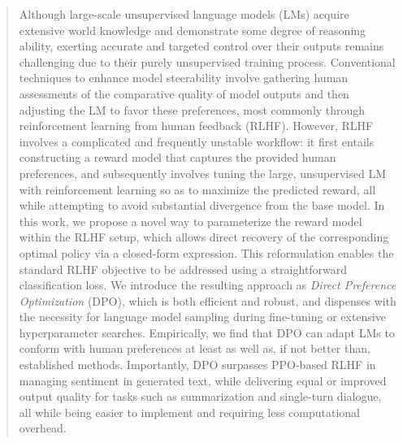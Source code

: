 \begin{abstract}
Although large-scale unsupervised language models (LMs) acquire extensive world knowledge and demonstrate some degree of reasoning ability, exerting accurate and targeted control over their outputs remains challenging due to their purely unsupervised training process. Conventional techniques to enhance model steerability involve gathering human assessments of the comparative quality of model outputs and then adjusting the LM to favor these preferences, most commonly through reinforcement learning from human feedback (RLHF). However, RLHF involves a complicated and frequently unstable workflow: it first entails constructing a reward model that captures the provided human preferences, and subsequently involves tuning the large, unsupervised LM with reinforcement learning so as to maximize the predicted reward, all while attempting to avoid substantial divergence from the base model. In this work, we propose a novel way to parameterize the reward model within the RLHF setup, which allows direct recovery of the corresponding optimal policy via a closed-form expression. This reformulation enables the standard RLHF objective to be addressed using a straightforward classification loss. We introduce the resulting approach as \textit{Direct Preference Optimization} (DPO), which is both efficient and robust, and dispenses with the necessity for language model sampling during fine-tuning or extensive hyperparameter searches. Empirically, we find that DPO can adapt LMs to conform with human preferences at least as well as, if not better than, established methods. Importantly, DPO surpasses PPO-based RLHF in managing sentiment in generated text, while delivering equal or improved output quality for tasks such as summarization and single-turn dialogue, all while being easier to implement and requiring less computational overhead.
\end{abstract}

